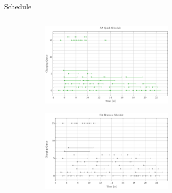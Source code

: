 \documentclass[aspectratio=169]{beamer}
\begin{document}
\begin{frame}[label={sec:org44faa18}]{Schedule}
\begin{columns}
\begin{column}{0.5\columnwidth}
\begin{figure}
\begin{subfigure}[t]{\textwidth}
\centering
    \includegraphics[width=0.7\textwidth]{img/sa-pap-paper-good/schedule-sa-quick}
\end{subfigure}
\begin{subfigure}[t]{\textwidth}
\centering
    \includegraphics[width=0.7\textwidth]{img/sa-pap-paper-good/schedule-sa-heuristic}
\end{subfigure}
\end{figure}
\end{column}
\end{columns}
\end{frame}
\end{document}
